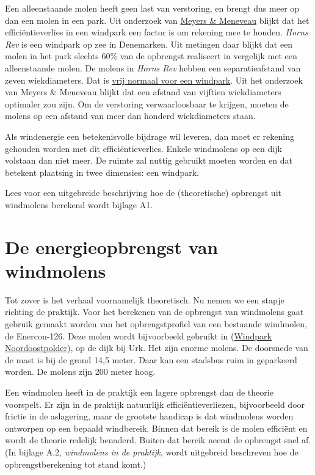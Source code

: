 \documentclass[
  11pt,
  a4paper,
]{book}
\begin{document}
Een alleenstaande molen heeft geen last van verstoring, en brengt dus meer op dan een molen in een park. Uit onderzoek van \href{https://www.researchgate.net/publication/230284417_Optimal_turbine_spacing_in_fully_developed_wind_farm_boundary_layers}{Meyers \& Meneveau} blijkt dat het efficiëntieverlies in een windpark een factor is om rekening mee te houden. \emph{Horns Rev} is een windpark op zee in Denemarken. Uit metingen daar blijkt dat een molen in het park slechts 60\% van de opbrengst realiseert in vergelijk met een alleenstaande molen. De molens in \emph{Horns Rev} hebben een separatieafstand van zeven wiekdiameters. Dat is \href{https://en.wikipedia.org/wiki/Wind_turbine\#Wind_turbine_spacing}{vrij normaal voor een windpark}. Uit het onderzoek van Meyers \& Meneveau blijkt dat een afstand van vijftien wiekdiameters optimaler zou zijn. Om de verstoring verwaarloosbaar te krijgen, moeten de molens op een afstand van meer dan honderd wiekdiameters staan.

Als windenergie een betekenisvolle bijdrage wil leveren, dan moet er rekening gehouden worden met dit efficiëntieverlies. Enkele windmolens op een dijk volstaan dan niet meer. De ruimte zal nuttig gebruikt moeten worden en dat betekent plaatsing in twee dimensies: een windpark.

Lees voor een uitgebreide beschrijving hoe de (theoretische) opbrengst uit windmolens berekend wordt bijlage A1.

\hypertarget{de-energieopbrengst-van-windmolens}{%
\section{De energieopbrengst van windmolens}\label{de-energieopbrengst-van-windmolens}}

Tot zover is het verhaal voornamelijk theoretisch. Nu nemen we een stapje richting de praktijk. Voor het berekenen van de opbrengst van windmolens gaat gebruik gemaakt worden van het opbrengstprofiel van een bestaande windmolen, de Enercon-126. Deze molen wordt bijvoorbeeld gebruikt in (\href{https://www.windparknoordoostpolder.nl/}{Windpark Noordoostpolder}), op de dijk bij Urk. Het zijn enorme molens. De doorsnede van de mast is bij de grond 14,5 meter. Daar kan een stadsbus ruim in geparkeerd worden. De molens zijn 200 meter hoog.

Een windmolen heeft in de praktijk een lagere opbrengst dan de theorie voorspelt. Er zijn in de praktijk natuurlijk efficiëntieverliezen, bijvoorbeeld door frictie in de aslagering, maar de grootste handicap is dat windmolens worden ontworpen op een bepaald windbereik. Binnen dat bereik is de molen efficiënt en wordt de theorie redelijk benaderd. Buiten dat bereik neemt de opbrengst snel af. (In bijlage A.2, \emph{windmolens in de praktijk}, wordt uitgebreid beschreven hoe de opbrengstberekening tot stand komt.)
\end{document}
